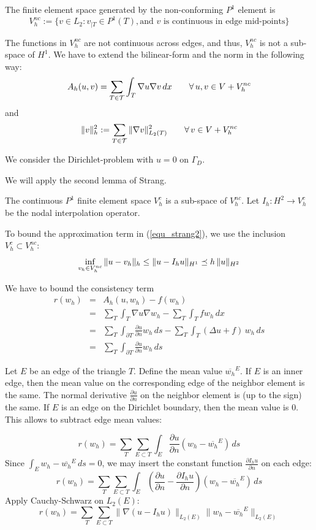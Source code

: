 The finite element space generated by the non-conforming $P^1$ element
is
$$
V_h^{nc} := \{ v \in L_2 : v_{|T} \in P^1(T), \mbox{and }v \mbox{ is continuous in edge mid-points} \}
$$

The functions in $V_h^{nc}$ are not continuous across edges, and thus, 
$V_h^{nc}$ is not a sub-space of $H^1$. We have to extend the bilinear-form and
the norm in the following way:
$$
A_h (u,v) = \sum_{T \in {\cal T}} \int_T \nabla u \nabla v \, dx
        \qquad \forall \, u, v \in V + V_h^{nc}
$$
and
$$
\| v \|_h^2 := \sum_{T \in {\cal T}}  \| \nabla v \|_{L_2(T)}^2 \qquad \forall \, v \in V + V_h^{nc}
$$


We consider the Dirichlet-problem with $u = 0$ on $\Gamma_D$. 


We will apply the second lemma of Strang.

The continuous $P^1$ finite element space $V_h^c$ is a sub-space of 
$V_h^{nc}$. Let $I_h : H^2 \rightarrow V_h^c$ be the nodal interpolation
operator.

To bound the approximation term in (\ref{equ_strang2}), we use the
inclusion $V_h^c \subset V_h^{nc}$:
$$
\inf_{v_h \in V_h^{nc}} \| u - v_h \|_h \leq \| u - I_h u \|_{H^1} \preceq h \, \| u \|_{H^2}
$$


We have to bound the consistency term
\begin{eqnarray*}
r(w_h) & = & A_h(u,w_h) - f(w_h) \\
        & = & \sum_T \int_T \nabla u \nabla w_h - \sum_T \int_T f w_h \, dx \\
        & = & \sum_T \int_{\partial T} \frac{\partial u}{\partial n} w_h \, ds 
                - \sum_T \int_T (\Delta u + f) \, w_h \, ds \\
        & = & \sum_T \int_{\partial T} \frac{\partial u}{\partial n} w_h \, ds 
\end{eqnarray*}


Let $E$ be an edge of the triangle $T$. Define the mean value $\overline{w_h}^E$. 
If $E$ is an inner edge, then the mean value on the corresponding edge of
the neighbor element is the same. The normal derivative $\frac{\partial u}{\partial n}$ on the neighbor element is (up to the sign) the same.
If $E$ is an edge on the Dirichlet boundary, then the mean value is 0.
This allows to subtract edge mean values:

$$
r(w_h) = \sum_T \sum_{E \subset T} \int_E \frac{\partial u}{\partial n} (w_h - \overline{w_h}^E) \, ds
$$
Since $\int_E w_h - \overline{w_h}^E \, ds = 0$, we may insert the 
constant function $\frac{\partial I_h u}{\partial n}$ on each edge:
$$
r(w_h) = \sum_T \sum_{E \subset T} \int_E 
        \left(\frac{\partial u}{\partial n} - \frac{\partial I_h u}{\partial n} \right) (w_h - \overline{w_h}^E) \, ds
$$
Apply Cauchy-Schwarz on $L_2(E)$:
$$
r(w_h) = \sum_T \sum_{E \subset T} \| \nabla (u - I_h u) \|_{L_2(E)} \| w_h - \overline{w_h}^E \|_{L_2(E)}
$$

